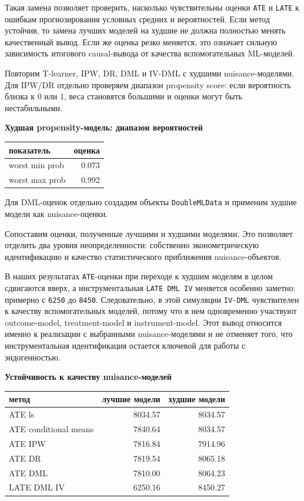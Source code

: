 \documentclass[11pt]{article}
\newcounter{none}
\begin{document}
Такая замена позволяет проверить, насколько чувствительны оценки
\texttt{ATE} и \texttt{LATE} к ошибкам прогнозирования условных средних
и вероятностей. Если метод устойчив, то замена лучших моделей на худшие
не должна полностью менять качественный вывод. Если же оценка резко
меняется, это означает сильную зависимость итогового causal-вывода от
качества вспомогательных ML-моделей.

    Повторим T-learner, IPW, DR, DML и IV-DML с худшими nuisance-моделями.
Для IPW/DR отдельно проверяем диапазон propensity score: если
вероятность близка к 0 или 1, веса становятся большими и оценки могут
быть нестабильными.

    \textbf{Худшая propensity-модель: диапазон вероятностей}

{\def\LTcaptype{none} %
\begin{longtable}[]{@{}lr@{}}
\toprule\noalign{}
показатель & оценка \\
\midrule\noalign{}
\endhead
\bottomrule\noalign{}
\endlastfoot
worst min prob & 0.073 \\
worst max prob & 0.992 \\
\end{longtable}
}

    Для DML-оценок отдельно создадим объекты \texttt{DoubleMLData} и
применим худшие модели как nuisance-оценки.

    Сопоставим оценки, полученные лучшими и худшими моделями. Это позволяет
отделить два уровня неопределенности: собственно эконометрическую
идентификацию и качество статистического приближения nuisance-объектов.

В наших результатах \texttt{ATE}-оценки при переходе к худшим моделям в
целом сдвигаются вверх, а инструментальная \texttt{LATE\ DML\ IV}
меняется особенно заметно: примерно с \texttt{6250} до \texttt{8450}.
Следовательно, в этой симуляции \texttt{IV-DML} чувствителен к качеству
вспомогательных моделей, потому что в нем одновременно участвуют
outcome-model, treatment-model и instrument-model. Этот вывод относится
именно к реализации с выбранными nuisance-моделями и не отменяет того,
что инструментальная идентификация остается ключевой для работы с
эндогенностью.

    \textbf{Устойчивость к качеству nuisance-моделей}

{\def\LTcaptype{none} %
\begin{longtable}[]{@{}lrr@{}}
\toprule\noalign{}
метод & лучшие модели & худшие модели \\
\midrule\noalign{}
\endhead
\bottomrule\noalign{}
\endlastfoot
ATE ls & 8034.57 & 8034.57 \\
ATE conditional means & 7840.64 & 8034.57 \\
ATE IPW & 7816.84 & 7914.96 \\
ATE DR & 7819.54 & 8065.18 \\
ATE DML & 7810.00 & 8064.23 \\
LATE DML IV & 6250.16 & 8450.27 \\
\end{longtable}
}
\end{document}

